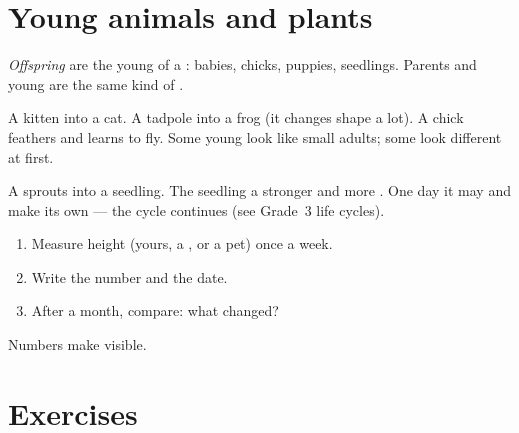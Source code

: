 \section{Young animals and plants}

\begin{definition}[Offspring]\label{def:g2:growing:offspring}
\emph{Offspring} are the young of a :
babies, chicks, puppies, seedlings. Parents and young are the same
kind of .
\end{definition}

\begin{example}\label{ex:g2:growing:young}
A kitten  into a cat. A tadpole  into a frog (it changes
shape a lot). A chick  feathers and learns to fly. Some young
look like small adults; some look different at first.
\end{example}

\begin{example}\label{ex:g2:growing:seedling}
A  sprouts into a seedling. The seedling  a stronger 
and more . One day it may  and make its own  ---
the cycle continues (see Grade~3 life cycles).
\end{example}

\begin{method}\label{met:g2:growing:watch}
\begin{enumerate}
  \item Measure height (yours, a , or a pet) once a week.
  \item Write the number and the date.
  \item After a month, compare: what changed?
\end{enumerate}
Numbers make  visible.
\end{method}

\section{Exercises}

